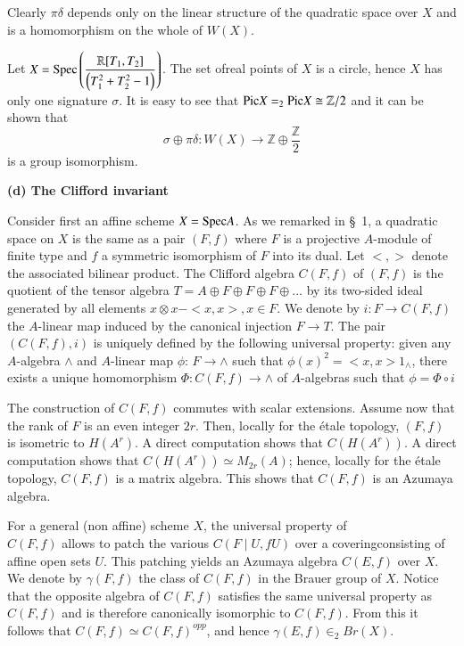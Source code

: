 Clearly $\pi\delta$ depends only on the linear structure of the quadratic space over $X$ and is a homomorphism on the whole of $W(X)$. 

\begin{EXP}
Let $X=\mathrm{Spec}\left(\dfrac{\mathbb{R}[T_1,T_2]}{\left(T^{2}_1+T^{2}_2-1\right)}\right)$. The set of\pageoriginale real points of $X$ is a circle, hence $X$ has only one signature $\sigma$. It is easy to see that $\mathrm{Pic}  X=_2\mathrm{Pic} X\cong \mathbb{Z}/2$ and it can be shown that 
$$
\sigma \oplus \pi\delta:W(X)\to \mathbb{Z}\oplus \dfrac{\mathbb{Z}}{2}
$$
is a group isomorphism. 
\end{EXP}

\medskip
\noindent
\textbf{(d) The Clifford invariant}

Consider first an affine scheme $X=\mathrm{Spec} A$. As we remarked in \S\ 1, a quadratic space on $X$ is the same as a pair $(F,f)$ where $F$ is a projective $A$-module of finite type and $f$ a symmetric isomorphism of $F$ into its dual. Let $<,>$ denote the associated bilinear product. The Clifford algebra $C(F,f)$ of $(F,f)$ is the quotient of the tensor algebra $T=A\oplus F\oplus F\oplus F\oplus\ldots$ by its two-sided ideal generated by all elements $x\otimes x-<x,x>,x\in F$. We denote by $i:F\to C(F,f)$ the $A$-linear map induced by the canonical injection $F\to T$. The pair $(C(F,f),i)$ is uniquely defined by the following universal property: given any $A$-algebra $\wedge$ and $A$-linear map $\phi$: $F\to \wedge$ such that $\phi(x)^{2}=<x,x>1_{\wedge}$, there exists a unique homomorphism $\Phi:C(F,f)\to \wedge$ of $A$-algebras such that $\phi=\Phi\circ i$ 

The construction of $C(F,f)$ commutes with scalar extensions. Assume now that the rank of $F$ is an even integer $2r$. Then, locally for the \'{e}tale topology, $(F,f)$ is isometric to $H\left(A^{r}\right)$. A direct computation shows that $C(H\left(A^{r}\right))$. A direct computation shows that $C(H\left(A^{r}\right))\simeq M_{2r}(A)$; hence, locally for the \'{e}tale topology, $C(F,f)$ is a matrix algebra. This shows that $C(F,f)$ is an Azumaya algebra.

For a general (non affine) scheme $X$, the universal property of \\$C(F,f)$ allows to patch the various $C\left(F\mid U, f U\right)$ over a covering\pageoriginale consisting of affine open sets $U$. This patching yields an Azumaya algebra $C(E,f)$ over $X$. We denote by $\gamma(F,f)$ the class of $C(F,f)$ in the Brauer group of $X$. Notice that the opposite algebra of $C(F,f)$ satisfies the same universal property as $C(F,f)$ and is therefore canonically isomorphic to $C(F,f)$. From this it follows that $C(F,f)\simeq C(F,f)^{opp}$, and hence $\gamma(E,f)\in_2 Br(X)$. 


